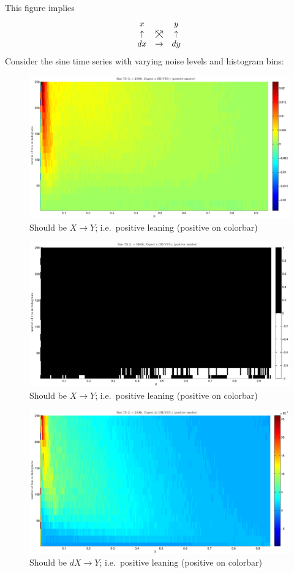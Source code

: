 \documentclass[a4paper,11pt]{article}
\begin{document}
This figure implies
$$
\begin{array}{ccc}
x & & y\\
\uparrow &\mathrel{\ooalign{\hss$\nearrow$\hss\cr$\nwarrow$}} & \uparrow\\
dx &\rightarrow & dy
\end{array}
$$
Consider the sine time series with varying noise levels and histogram bins:
\begin{figure}[!H]
\includegraphics[scale=0.55]{SineTSxy.eps}
\caption{Should be $X\rightarrow Y$; i.e.\ positive leaning (positive on colorbar)}
\end{figure}
\begin{figure}[!H]
\includegraphics[scale=0.55]{SineTSxy_3C.eps}
\caption{Should be $X\rightarrow Y$; i.e.\ positive leaning (positive on colorbar)}
\end{figure}
\begin{figure}[!H]
\includegraphics[scale=0.55]{SineTSdxy.eps}
\caption{Should be $dX\rightarrow Y$; i.e.\ positive leaning (positive on colorbar)}
\end{figure}
\end{document}
